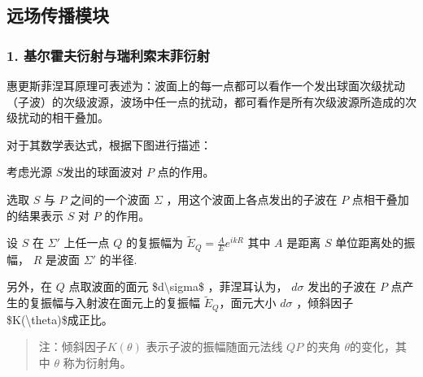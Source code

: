 \documentclass[a4paper,10pt,english]{sphinxmanual}
\begin{document}
\sphinxAtStartPar
{}





\sphinxstepscope


\subsection{远场传播模块}
\label{\detokenize{_u7b80_u4ecb/_u6838_u5fc3_u8bbe_u8ba1_u4f18_u5316_u7b97_u6cd5/_u8fdc_u573a_u4f20_u64ad_u6a21_u5757/contents:id1}}\label{\detokenize{_u7b80_u4ecb/_u6838_u5fc3_u8bbe_u8ba1_u4f18_u5316_u7b97_u6cd5/_u8fdc_u573a_u4f20_u64ad_u6a21_u5757/contents::doc}}

\subsubsection{1. 基尔霍夫衍射与瑞利\sphinxhyphen{}索末菲衍射}
\label{\detokenize{_u7b80_u4ecb/_u6838_u5fc3_u8bbe_u8ba1_u4f18_u5316_u7b97_u6cd5/_u8fdc_u573a_u4f20_u64ad_u6a21_u5757/contents:id2}}
\sphinxAtStartPar
惠更斯\sphinxhyphen{}菲涅耳原理可表述为：波面上的每一点都可以看作一个发出球面次级扰动（子波）的次级波源，波场中任一点的扰动，都可看作是所有次级波源所造成的次级扰动的相干叠加。

\sphinxAtStartPar
对于其数学表达式，根据下图进行描述：

\sphinxAtStartPar


\sphinxAtStartPar
{}





\sphinxAtStartPar
考虑光源 \(S\)发出的球面波对 \(P\) 点的作用。

\sphinxAtStartPar
选取 \(S\) 与 \(P\) 之间的一个波面 \(\Sigma\) ，用这个波面上各点发出的子波在 \(P\) 点相干叠加的结果表示 \(S\) 对 \(P\) 的作用。

\sphinxAtStartPar
设 \(S\)  在 \(\Sigma'\) 上任一点 \(Q\) 的复振幅为
\(\tilde{E}_Q=\frac{A}{E}e^{ikR}\)
其中 \(A\)  是距离 \(S\)  单位距离处的振幅， \(R\)  是波面 \(\Sigma'\) 的半径.

\sphinxAtStartPar
另外，在 \(Q\) 点取波面的面元 \$d\textbackslash{}sigma\$ ，菲涅耳认为， \(d\sigma\) 发出的子波在 \(P\) 点产生的复振幅与入射波在面元上的复振幅 \(\tilde{E}_Q\)，面元大小 \(d\sigma\) ，倾斜因子\$K(\textbackslash{}theta)\$成正比。
\begin{quote}

\sphinxAtStartPar
注：倾斜因子\(K(\theta)\) 表示子波的振幅随面元法线 \(QP\) 的夹角 \(\theta\)的变化，其中 \(\theta\) 称为衍射角。
\end{quote}
\end{document}

